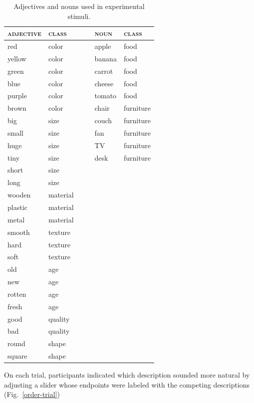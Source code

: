 \documentclass[11pt]{article}
\begin{document}
\begin{table}
	\centering
	\caption{Adjectives and nouns used in experimental stimuli.}\label{stim-table}
	\begin{tabular}{llc||cll}\hline
		\textsc{adjective} & \textsc{class} &&& \textsc{noun} & \textsc{class}\\\hline
				red & color &&& apple & food \\
				yellow & color &&& banana & food \\
				green & color &&& carrot & food \\
				blue & color &&& cheese & food \\
				purple & color &&& tomato & food \\
				brown & color &&& chair & furniture \\					
				big & size &&& couch & furniture \\
				small & size &&& fan & furniture \\					
				huge & size &&& TV & furniture \\					
				tiny & size &&& desk & furniture \\					
				short & size &&& \\					
				long & size &&& 	\\						
				wooden & material &&& \\
				plastic & material &&& \\
				metal & material &&& \\
				smooth & texture &&& \\
				hard & texture &&& \\
				soft & texture &&& \\
				old & age &&& \\
				new & age &&& \\
				rotten & age &&&\\ 
				fresh & age &&& \\
				good & quality &&& \\
				bad & quality &&& \\
				round & shape &&&\\ 						
				square & shape &&&\\ 
		\end{tabular}
\end{table}

On each trial, participants indicated which description sounded more natural by adjusting a slider whose endpoints were labeled with the competing descriptions (Fig.~\ref{order-trial})
\end{document}
